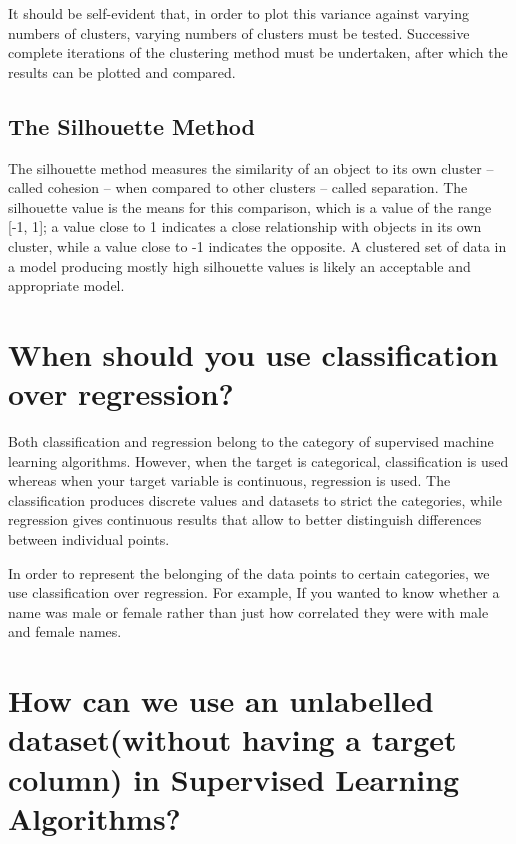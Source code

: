 \documentclass[
]{book}
\begin{document}
It should be self-evident that, in order to plot this variance against varying numbers of clusters, varying numbers of clusters must be tested. Successive complete iterations of the clustering method must be undertaken, after which the results can be plotted and compared.

\hypertarget{the-silhouette-method}{%
\subsection{The Silhouette Method}\label{the-silhouette-method}}

The silhouette method measures the similarity of an object to its own cluster -- called cohesion -- when compared to other clusters -- called separation. The silhouette value is the means for this comparison, which is a value of the range {[}-1, 1{]}; a value close to 1 indicates a close relationship with objects in its own cluster, while a value close to -1 indicates the opposite. A clustered set of data in a model producing mostly high silhouette values is likely an acceptable and appropriate model.

\hypertarget{when-should-you-use-classification-over-regression}{%
\section{When should you use classification over regression?}\label{when-should-you-use-classification-over-regression}}

Both classification and regression belong to the category of supervised machine learning algorithms. However, when the target is categorical, classification is used whereas when your target variable is continuous, regression is used.
The classification produces discrete values and datasets to strict the categories, while regression gives continuous results that allow to better distinguish differences between individual points.

In order to represent the belonging of the data points to certain categories, we use classification over regression.
For example, If you wanted to know whether a name was male or female rather than just how correlated they were with male and female names.

\hypertarget{how-can-we-use-an-unlabelled-datasetwithout-having-a-target-column-in-supervised-learning-algorithms}{%
\section{How can we use an unlabelled dataset(without having a target column) in Supervised Learning Algorithms?}\label{how-can-we-use-an-unlabelled-datasetwithout-having-a-target-column-in-supervised-learning-algorithms}}
\end{document}
